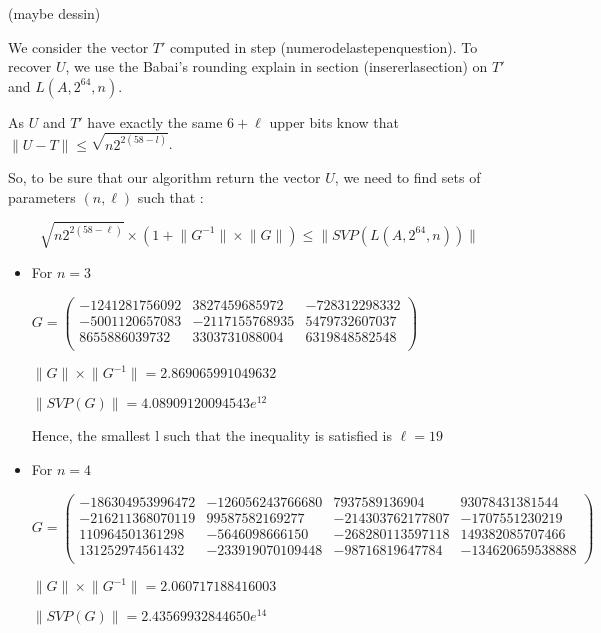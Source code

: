 \documentclass[preprint,svgnames]{iacrtrans}
\begin{document}
(maybe dessin)


We consider the vector \(T'\) computed in step (numerodelastepenquestion). To recover \(U\), we use the Babai's rounding explain in section (insererlasection) on \(T'\) and \(L(A,2^{64},n)\).

As \(U\) and \(T'\) have exactly the same \(6+\ell\) upper bits  know that \(\lVert U-T \rVert \leqslant \sqrt{n2^{2(58-l)}}\).

So, to be sure that our algorithm return the vector \(U\), we need to find sets of parameters \((n,\ell)\) such that :	 

\[\sqrt{n2^{2(58-\ell)}} \times (1 +\lVert G^{-1} \rVert  \times \lVert G\rVert) \leqslant \lVert SVP(L(A,2^{64},n))\rVert \]

\begin{itemize}
	\item For \(n=3\)
	
	\(G = \begin{pmatrix}
	-1241281756092&3827459685972&-728312298332\\
	-5001120657083&-2117155768935&5479732607037\\
	8655886039732&3303731088004&6319848582548\\
	\end{pmatrix}\)
	
	\(\lVert G \rVert \times \lVert G^{-1} \rVert = 2.869065991049632\)
	
	\(\lVert SVP(G) \rVert = 4.08909120094543e{^12}\)
	
	Hence, the smallest l such that the inequality is satisfied is \(\ell = 19\) %
	
	\item For \(n=4\)
	
	\(G = \begin{pmatrix}
	-186304953996472&-126056243766680&7937589136904&93078431381544\\
	-216211368070119&99587582169277&-214303762177807&-1707551230219\\
	110964501361298&-5646098666150&-268280113597118&149382085707466\\
	131252974561432&-233919070109448&-98716819647784&-134620659538888\\
	\end{pmatrix}\)
	
	\(\lVert G \rVert \times \lVert G^{-1} \rVert = 2.060717188416003\)
	
	\(\lVert SVP(G) \rVert = 2.43569932844650e^{14}\)
	

\end{itemize}
\end{document}

